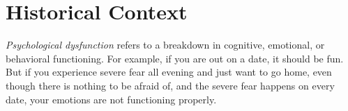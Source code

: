 \section{Historical Context}\label{sec:Historical_Context}
\begin{definition}\label{def:Psychological_Disfunction}
  \emph{Psychological dysfunction} refers to a breakdown in cognitive, emotional, or behavioral functioning.
  For example, if you are out on a date, it should be fun.
  But if you experience severe fear all evening and just want to go home, even though there is nothing to be afraid of, and the severe fear happens on every date, your emotions are not functioning properly.
\end{definition}

